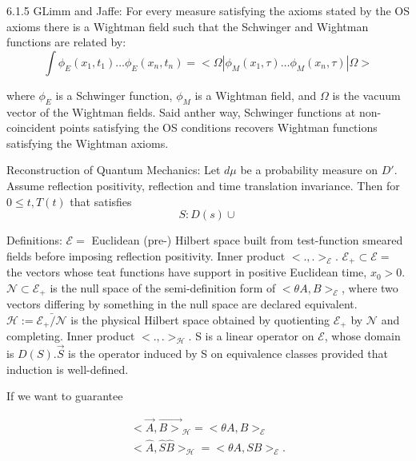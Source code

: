 \documentclass{article}
\newcommand{\1}{\mathbbm{1}}
\theoremstyle{plain}
\theoremstyle{definition}
\numberwithin{equation}{section}
\begin{document}
6.1.5 GLimm and Jaffe: For every measure satisfying the axioms stated by the OS axioms there is a Wightman field such that the Schwinger and Wightman functions are related by: 
\begin{equation}
    \int \phi_E (x_1, t_1) \ldots \phi_E(x_n, t_n)= < \Omega| \phi_M(x_1, \tau) \ldots \phi_M(x_n, \tau) | \Omega> 
\end{equation}

where $\phi_E$ is a Schwinger function, $\phi_M$ is a Wightman field, and $\Omega$ is the vacuum vector of the Wightman fields. Said anther way, Schwinger functions at non-coincident points satisfying the OS conditions recovers Wightman functions satisfying the Wightman axioms.

 

Reconstruction of Quantum Mechanics: Let $d \mu$ be a probability measure on $D'$. Assume reflection positivity, reflection and time translation invariance. Then for $0 \leq t , T(t) $ that satisfies 
\begin{equation}
S: D(s) \cup 
\end{equation}

Definitions: $\mathcal{E}=$ Euclidean (pre-) Hilbert space built from test-function smeared fields before imposing reflection positivity. Inner product $< .,.>_{\mathcal{E}}$. $\mathcal{E}_+ \subset \mathcal{E}=$ the vectors whose teat functions have support in positive Euclidean time, $x_0 > 0$. $\mathcal{N} \subset \mathcal{E}_+$ is the null space of the semi-definition form of $< \theta A, B> _{\mathcal{E}}$, where two vectors differing by something in the null space are declared equivalent. $\mathcal{H} := \bar{ \mathcal{E}_{+}/\mathcal{N}}$ is the physical Hilbert space obtained by quotienting $\mathcal{E}_+$ by $\mathcal{N}$ and completing. Inner product $< . , . >_{\mathcal{H}}$. S is a linear operator on $\mathcal{E}$, whose domain is $D(S)$.$\vec{S}$ is the operator induced by S on equivalence classes provided that induction is well-defined. 

If we want to guarantee 

\begin{equation}
    \begin{split}
        < \vec{A}, \vec{B >}_{\mathcal{H}}= < \theta A, B>_{\mathcal{E}}
        \\
        < \hat{A}, \hat{S} \hat{B}>_{\mathcal{H}}= < \theta A, SB>_{\mathcal{E}}.
    \end{split}
\end{equation}
\end{document}
